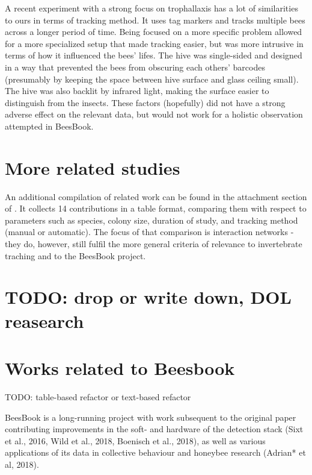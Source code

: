 
A recent experiment with a strong focus on trophallaxis
\citep{gernat_automated_2018} has a lot of similarities to ours in terms of
tracking method. It uses tag markers and tracks multiple bees across a longer
period of time. Being focused on a more specific problem allowed for a more
specialized setup that made tracking easier, but was more intrusive in terms of
how it influenced the bees’ lifes. The hive was single-sided and designed in a
way that prevented the bees from obscuring each others’ barcodes (presumably by
keeping the space between hive surface and glass ceiling small). The hive was
also backlit by infrared light, making the surface easier to distinguish from
the insects. These factors (hopefully) did not have a strong adverse effect on
the relevant data, but would not work for a holistic observation attempted in
BeesBook.

\section{More related studies}

An additional compilation of related work can be found in the attachment section
of \citep{schlegel_temporal_2017}. It collects 14 contributions in a table
format, comparing them with respect to parameters such as species, colony size,
duration of study, and tracking method (manual or automatic). The focus of that
comparison is interaction networks - they do, however, still fulfil the more
general criteria of relevance to invertebrate traching and to the BeesBook project.

\section{TODO: drop or write down, DOL reasearch} 


\section{Works related to Beesbook} 

TODO: table-based refactor or text-based refactor

BeesBook is a long-running project with work subsequent to the original paper
contributing improvements in the soft- and hardware of the detection stack (Sixt
et al., 2016, Wild et al., 2018, Boenisch et al., 2018), as well as various
applications of its data in collective behaviour and honeybee research (Adrian*
et al, 2018).

